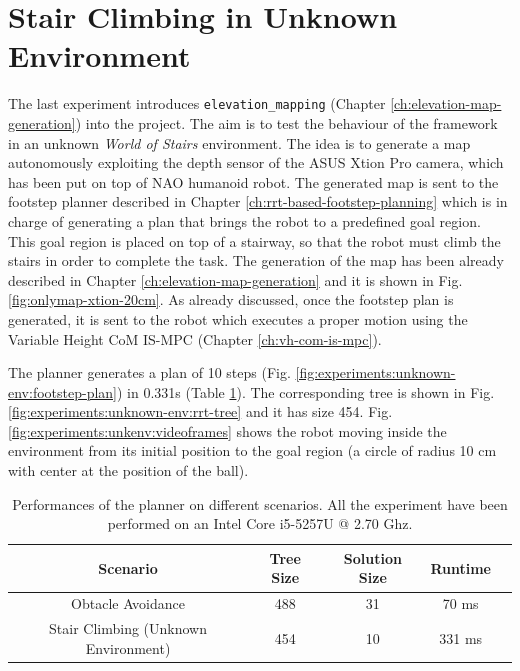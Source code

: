 \section{Stair Climbing in Unknown Environment}
\label{sec:stair-climbing-unkenv}
The last experiment introduces \texttt{elevation\_mapping} (Chapter 
\ref{ch:elevation-map-generation}) into the project. The aim is to test the 
behaviour of the framework in an unknown \textit{World of Stairs} environment.
The idea is to generate a map autonomously exploiting the depth sensor of the 
ASUS Xtion Pro camera, which has been put on top of NAO humanoid robot.
The generated map is sent to the footstep planner described in Chapter 
\ref{ch:rrt-based-footstep-planning} which is in charge of generating a 
plan that brings the robot to a predefined goal region. This goal region is 
placed on top of a stairway, so that the robot must climb the stairs in order 
to complete the task. The generation of the map has been already described in 
Chapter \ref{ch:elevation-map-generation} and it is shown in Fig. 
\ref{fig:onlymap-xtion-20cm}. As already discussed, once the footstep plan 
is generated, it is sent to the robot which executes a proper motion 
using the Variable Height CoM IS-MPC (Chapter \ref{ch:vh-com-is-mpc}).

The planner generates a plan of 10 steps (Fig.
\ref{fig:experiments:unknown-env:footstep-plan}) in 0.331s (Table
\ref{table:rrt-stats}). The corresponding 
tree is shown in Fig. \ref{fig:experiments:unknown-env:rrt-tree} and it has 
size 454. Fig. \ref{fig:experiments:unkenv:videoframes} shows the robot moving
inside the environment from its initial position
to the goal region (a circle of radius 10 cm with center at the position
of the ball).

\begin{table}
	\centering
	\begin{tabular}{*{5}{c}}
    Scenario & Tree Size & Solution Size & Runtime\\
		\hline
    Obtacle Avoidance & 488 & 31 & 70 ms \\
    Stair Climbing (Unknown Environment) & 454 & 10 & 331 ms
	\end{tabular}
  \caption{Performances of the planner on different scenarios. All the 
      experiment have been performed on an Intel Core i5-5257U @ 2.70 Ghz.}
	\label{table:rrt-stats}
\end{table}


